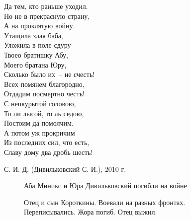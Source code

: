 \begin{scriptsize}
\begin{multicols}{2}
    Да тем, кто раньше уходил.\\
    Но не в прекрасную страну,\\
    А на проклятую войну.\\
    \vfill
    \noindent
    Утащила злая баба,\\
    Уложила в поле сдуру\\
    Твоео братишку Абу,\\
    Моего братана Юру,\\
    Сколько было их~-- не счесть!\\
    Всех помянем благородно,\\
    Отдадим посмертно честь!\\
    \vfill
    \noindent
    С непкурытой головою,\\
    То ли лысой, то ль седою,\\
    Постоим да помолчим.\\
    А потом уж прокричим\\
    Из последних сил, что есть,\\
    Славу дому два дробь шесть!\\
\end{multicols}
\end{scriptsize}
\vspace*{-5mm}

{\raggedleft С. И. Д. (Дивильковский С. И.), 2010 г. }


\begin{figure}[ht]
    \begin{minipage}[h!]{40mm}
    \end{minipage}
    \hfill
    \begin{minipage}[h!]{40mm}
    \end{minipage}    
    \vspace{-20pt}
    \caption{Аба Миникс и Юра Дивильковский погибли на войне}
\end{figure}

\begin{figure}[h!]
    \begin{minipage}[h!]{40mm}
    \end{minipage}
    \hfill
    \begin{minipage}[h!]{40mm}
    \end{minipage}
    \vspace{-20pt}
    \caption{Отец и сын Короткины. Воевали на разных фронтах. Переписывались. Жора погиб. Отец выжил.}
\end{figure}


